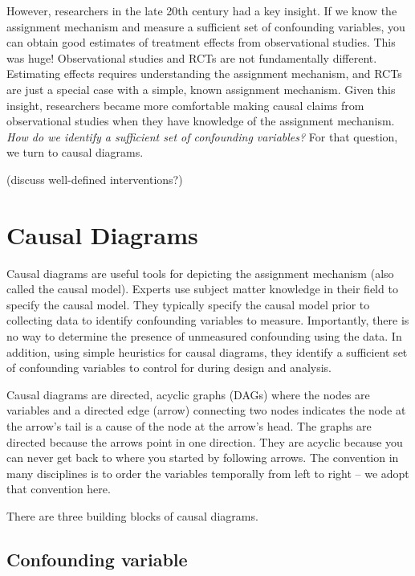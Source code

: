 \documentclass[
]{book}
\begin{document}
However, researchers in the late 20th century had a key insight. If we know the assignment mechanism and measure a sufficient set of confounding variables, you can obtain good estimates of treatment effects from observational studies. This was huge! Observational studies and RCTs are not fundamentally different. Estimating effects requires understanding the assignment mechanism, and RCTs are just a special case with a simple, known assignment mechanism. Given this insight, researchers became more comfortable making causal claims from observational studies when they have knowledge of the assignment mechanism. \emph{How do we identify a sufficient set of confounding variables?} For that question, we turn to causal diagrams.

(discuss well-defined interventions?)

\hypertarget{causal-diagrams}{%
\section{Causal Diagrams}\label{causal-diagrams}}

Causal diagrams are useful tools for depicting the assignment mechanism (also called the causal model). Experts use subject matter knowledge in their field to specify the causal model. They typically specify the causal model prior to collecting data to identify confounding variables to measure. Importantly, there is no way to determine the presence of unmeasured confounding using the data. In addition, using simple heuristics for causal diagrams, they identify a sufficient set of confounding variables to control for during design and analysis.

Causal diagrams are directed, acyclic graphs (DAGs) where the nodes are variables and a directed edge (arrow) connecting two nodes indicates the node at the arrow's tail is a cause of the node at the arrow's head. The graphs are directed because the arrows point in one direction. They are acyclic because you can never get back to where you started by following arrows. The convention in many disciplines is to order the variables temporally from left to right -- we adopt that convention here.

There are three building blocks of causal diagrams.

\hypertarget{confounding-variable}{%
\subsection{Confounding variable}\label{confounding-variable}}
\end{document}
